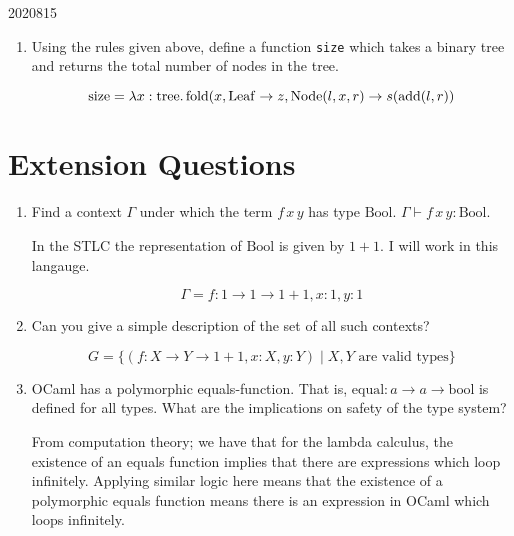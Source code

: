 \documentclass[10pt,\jkfside,a4paper]{article}
\begin{document}
\begin{enumerate}
\begin{examquestion}{2020}{8}{15}
\begin{enumerate}[label=(\textit{\alph*})]
\begin{enumerate}[label=(\roman*)]
                \item Using the rules given above, define a function \texttt{size} which takes a binary tree and returns the total number of nodes in the tree.

                \[
                    \mathrm{size} = \lambda x: \mathrm{tree}\ldotp \mathrm{fold}(x, \mathrm{Leaf} \to z, \mathrm{Node}(l, x, r) \to s(\mathrm{add}(l, r))
                \]

            \end{enumerate}

        \end{enumerate}

    \end{examquestion}

\end{enumerate}

\section{Extension Questions}

\begin{enumerate}

    \item Find a context $\Gamma$ under which the term $f\, x\, y$ has type $\mathrm{Bool}$. \ie $\Gamma \vdash f\, x\, y: \mathrm{Bool}$.

    In the STLC the representation of $\mathrm{Bool}$ is given by $1 + 1$. I will work in this langauge.

    \[
        \Gamma = f: 1 \to 1 \to 1 + 1, x: 1, y: 1
    \]

    \item Can you give a simple description of the set of all such contexts?

    \[
        G = \{(f: X \to Y \to 1 + 1, x: X, y: Y) \mid X, Y \text{ are valid types}\}
    \]

    \item OCaml has a polymorphic equals-function. That is, $\mathrm{equal}: a \to a \to \mathrm{bool}$ is defined for all types. What are the implications on safety of the type system?

    From computation theory; we have that for the lambda calculus, the existence of an equals function implies that there are expressions which loop infinitely. Applying similar logic here means that the
    existence of a polymorphic equals function means there is an expression in OCaml which loops infinitely.

\end{enumerate}
\end{document}
